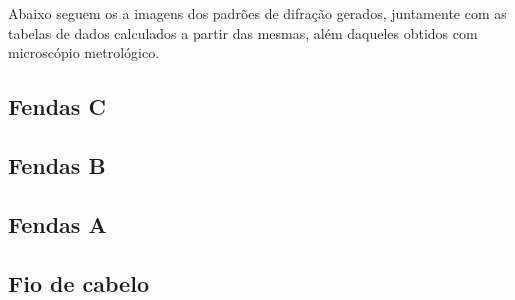 Abaixo seguem os a imagens dos padrões de difração gerados, juntamente com as tabelas de dados calculados a partir das mesmas, além daqueles obtidos com microscópio metrológico.


\subsection{Fendas C}




\subsection{Fendas B}





\subsection{Fendas A}






\subsection{Fio de cabelo}




